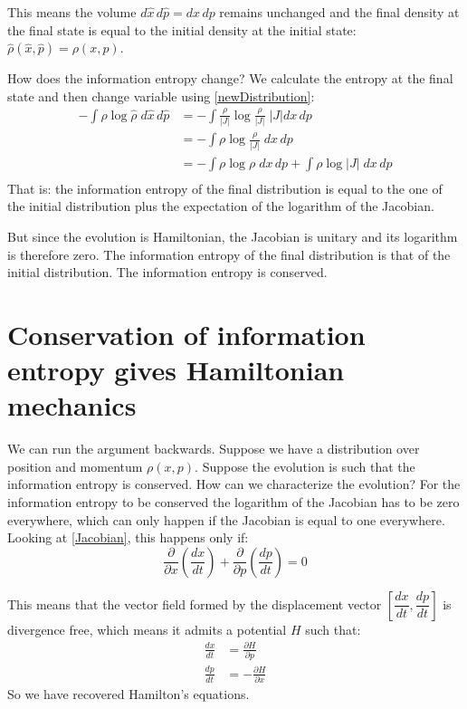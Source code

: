 \documentclass[aps,pra,10pt,floatfix,nofootinbib]{revtex4-1}
\theoremstyle{definition}
\begin{document}
This means the volume $d\hat{x}\,d\hat{p} = dx \,dp$ remains unchanged and the final density at the final state is equal to the initial density at the initial state: $\hat{\rho}(\hat{x}, \hat{p}) = \rho(x, p)$.  

How does the information entropy change? We calculate the entropy at the final state and then change variable using \eqref{newDistribution}:
\begin{equation}
\begin{aligned}
-\int \hat{\rho} \log \hat{\rho} \; d\hat{x}\,d\hat{p}&= -\int \frac{\rho}{|J|} \log \frac{\rho}{|J|} \; |J| dx \,dp \\
&= -\int \rho \log \frac{\rho}{|J|} \; dx \,dp \\
&= -\int \rho \log \rho \; dx \,dp + \int \rho \log |J| \; dx \,dp \\
\end{aligned}
\label{newEntropy}
\end{equation}
That is: the information entropy of the final distribution is equal to the one of the initial distribution plus the expectation of the logarithm of the Jacobian.

But since the evolution is Hamiltonian, the Jacobian is unitary and its logarithm is therefore zero. The information entropy of the final distribution is that of the initial distribution. The information entropy is conserved.

\section{Conservation of information entropy gives Hamiltonian mechanics}

We can run the argument backwards. Suppose we have a distribution over position and momentum $\rho(x, p)$. Suppose the evolution is such that the information entropy is conserved. How can we characterize the evolution? For the information entropy to be conserved the logarithm of the Jacobian has to be zero everywhere, which can only happen if the Jacobian is equal to one everywhere. Looking at \eqref{Jacobian}, this happens only if:
\begin{equation}
\dfrac{\partial}{\partial x} \left( \dfrac{dx}{dt} \right) + \dfrac{\partial}{\partial p} \left( \dfrac{dp}{dt} \right) = 0
\label{divergenceFree}
\end{equation}

This means that the vector field formed by the displacement vector $\left[ \dfrac{dx}{dt}, \dfrac{dp}{dt}\right]$ is divergence free, which means it admits a potential $H$ such that:
\begin{equation}
\begin{aligned}
\frac{dx}{dt} &= \frac{\partial H}{\partial p}  \\
\frac{dp}{dt} &= - \frac{\partial H}{\partial x}
\end{aligned}
\label{Hamilton}
\end{equation}
So we have recovered Hamilton's equations.
\end{document}
